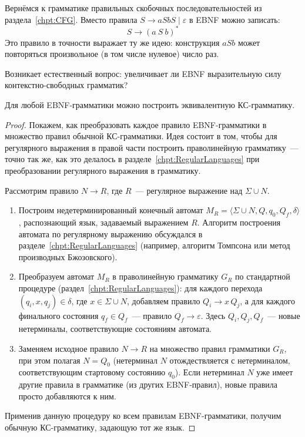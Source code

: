 \begin{example}
    \label{exmpl:ebnf_dyck}
    Вернёмся к грамматике правильных скобочных последовательностей из раздела~\ref{chpt:CFG}.
    Вместо правила $S \to a S b S \mid \varepsilon$ в EBNF можно записать:
    \[
    S \to (a \ S \ b)^*
    \]
    Это правило в точности выражает ту же идею: конструкция $a S b$ может повторяться произвольное (в том числе нулевое) число раз.
\end{example}

Возникает естественный вопрос: увеличивает ли EBNF выразительную силу контекстно-свободных грамматик?

\begin{theorem}
    \label{thm:ebnf_cfg}
    Для любой EBNF-грамматики можно построить эквивалентную КС-грамматику.
\end{theorem}

\begin{proof}
    Покажем, как преобразовать каждое правило EBNF-грамматики в множество правил обычной КС-грамматики.
    Идея состоит в том, чтобы для регулярного выражения в правой части построить праволинейную грамматику~--- точно так же, как это делалось в разделе~\ref{chpt:RegularLanguages} при преобразовании регулярного выражения в грамматику.

    Рассмотрим правило $N \to R$, где $R$~--- регулярное выражение над $\Sigma \cup N$.
    \begin{enumerate}
        \item Построим недетерминированный конечный автомат $M_R = \langle \Sigma \cup N, Q, q_0, Q_f, \delta \rangle$, распознающий язык, задаваемый выражением $R$.
        Алгоритм построения автомата по регулярному выражению обсуждался в разделе~\ref{chpt:RegularLanguages} (например, алгоритм Томпсона или метод производных Бжозовского).
        \item Преобразуем автомат $M_R$ в праволинейную грамматику $G_R$ по стандартной процедуре (раздел~\ref{chpt:RegularLanguages}):
        для каждого перехода $(q_i, x, q_j) \in \delta$, где $x \in \Sigma \cup N$, добавляем правило $Q_i \to x\,Q_j$, а для каждого финального состояния $q_f \in Q_f$~--- правило $Q_f \to \varepsilon$.
        Здесь $Q_i, Q_j, Q_f$~--- новые нетерминалы, соответствующие состояниям автомата.
        \item Заменяем исходное правило $N \to R$ на множество правил грамматики $G_R$, при этом полагая $N = Q_0$ (нетерминал $N$ отождествляется с нетерминалом, соответствующим стартовому состоянию $q_0$).
        Если нетерминал $N$ уже имеет другие правила в грамматике (из других EBNF-правил), новые правила просто добавляются к ним.
    \end{enumerate}
    Применив данную процедуру ко всем правилам EBNF-грамматики, получим обычную КС-грамматику, задающую тот же язык.
\end{proof}

